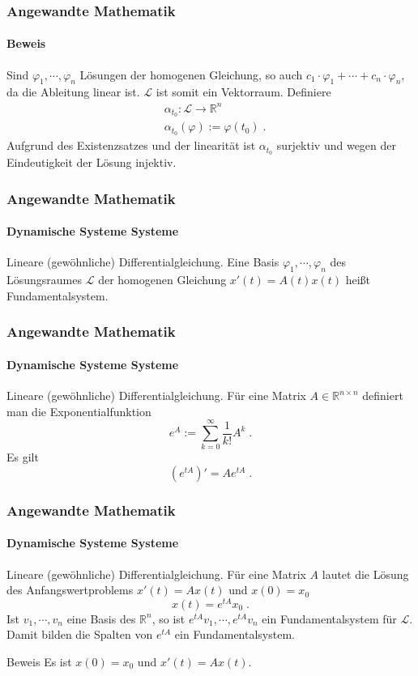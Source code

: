 \documentclass{beamer}
\begin{document}
\begin{frame}
    \frametitle{Angewandte Mathematik}
\framesubtitle{Beweis}
Sind  $\varphi_1, \cdots, \varphi_n$ Lösungen der homogenen Gleichung, so auch $ c_1 \cdot \varphi_1 + \cdots + c_n \cdot \varphi_n$, da die Ableitung linear ist.
$\mathcal{L}$ ist somit ein Vektorraum. Definiere 
\begin{align*}
& \alpha_{t_0} : \mathcal{L} \to \mathbb{R}^n \\
& \alpha_{t_0} (\varphi) := \varphi(t_0) \; .
\end{align*} 
Aufgrund des Existenzsatzes und der linearität ist $ \alpha_{t_0}$ surjektiv und wegen der Eindeutigkeit der Lösung injektiv.
 \end{frame}


\begin{frame}
    \frametitle{Angewandte Mathematik}
\framesubtitle{Dynamische Systeme Systeme}
\begin{block}{Lineare (gewöhnliche) Differentialgleichung.}
Eine Basis  $\varphi_1, \cdots, \varphi_n$ des Lösungsraumes $\mathcal{L}$ der homogenen Gleichung $x'(t) = A(t)x(t)$ heißt Fundamentalsystem.
\end{block}

 \end{frame}

\begin{frame}
    \frametitle{Angewandte Mathematik}
\framesubtitle{Dynamische Systeme Systeme}
\begin{block}{Lineare (gewöhnliche) Differentialgleichung.}
Für eine Matrix $A \in \mathbb{R}^{n \times n}$ definiert man die Exponentialfunktion 
$$  e^{ A}  := \sum_{k= 0}^{\infty} \frac{1}{k!} A^k \; .$$
Es gilt  
$$  (e^{ tA})' = A e^{tA}  \; .$$
\end{block}

 \end{frame}

\begin{frame}
    \frametitle{Angewandte Mathematik}
\framesubtitle{Dynamische Systeme Systeme}
\begin{block}{Lineare (gewöhnliche) Differentialgleichung.}
Für eine Matrix $A$ lautet die Lösung des Anfangswertproblems $x'(t) = Ax(t)$ und $x(0) = x_0$
$$ x(t) = e^{tA} x_0 \;.$$ Ist $v_1, \cdots , v_n$ eine Basis des $\mathbb{R}^n$, so ist $e^{tA}v_1, \cdots , e^{tA}v_n$ ein Fundamentalsystem für $\mathcal{L}$. Damit bilden die Spalten von  $e^{tA}$ ein Fundamentalsystem.
\end{block}

\begin{block}{Beweis}
Es ist $x(0) = x_0$ und $x'(t)= A x(t)$. 
\end{block}
 \end{frame}
\end{document}
